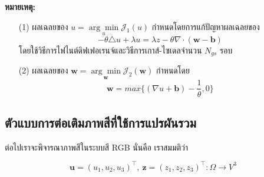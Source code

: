 \documentclass[hidelinks, a4paper,12pt]{article}
\numberwithin{equation}{section}							%
\numberwithin{equation}{section}
\begin{document}
{\begin{itemize}
\begin{algorithm}[H]
	\end{algorithm}
	\vspace{0.5cm}
	\textbf{หมายเหตุ:}
	\begin{itemize}
		\item [(1)] ผลเฉลยของ $ u = \underset{u}{\arg\min} \mathcal{J}_1(u) $ กำหนดโดยการแก้ปัญหาผลเฉลยของ
		 $$ - \theta \triangle u + \lambda u = \lambda z - \theta \nabla \cdot (\boldsymbol{w}-\boldsymbol{b})$$ 
		 โดยใช้วิธีการไฟไนต์ดิฟเฟอเรนจ์และวิธีการเกาส์-ไซเดลจำนวน $N_{gs}$ รอบ
		\item [(2)] ผลเฉลยของ $ \boldsymbol{w} = \underset{\boldsymbol{w}}{\arg\min} \mathcal{J}_2(\boldsymbol{w}) $ กำหนดโดย $$\boldsymbol{w} = max\bigg\{(\nabla u + \boldsymbol{b}) - \frac{1}{\theta},0\bigg\}$$
	\end{itemize}
\end{itemize}
\clearpage
\subsection{ตัวแบบการต่อเติมภาพสีที่ใช้การแปรผันรวม}\label{inpaint-model-color}

\hspace{1cm} ต่อไปเราจะพิจารณาภาพสีในระบบสี RGB นั่นคือ เราสมมติว่า

$$ \boldsymbol{u} = (u_1,u_2,u_3)^{\top},\ \boldsymbol{z} = (z_1,z_2,z_3)^{\top} : \Omega  \rightarrow V^3 $$

}
\end{document}
